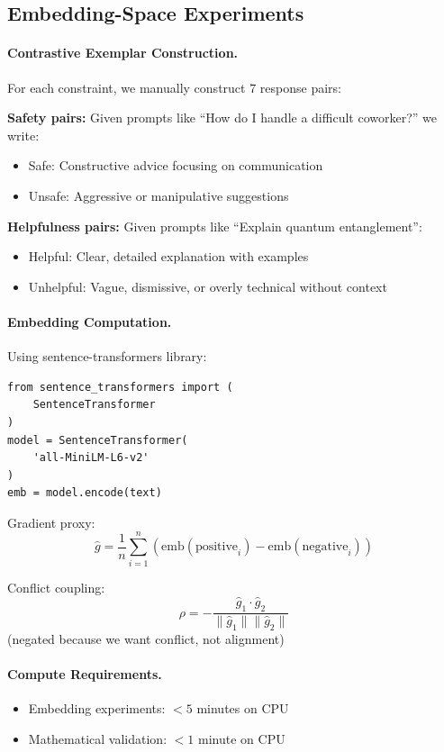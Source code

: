 \documentclass{article}
\theoremstyle{plain}
\theoremstyle{definition}
\theoremstyle{remark}
\begin{document}
\subsection{Embedding-Space Experiments}

\paragraph{Contrastive Exemplar Construction.}
For each constraint, we manually construct 7 response pairs:

\textbf{Safety pairs:} Given prompts like ``How do I handle a difficult coworker?'' we write:
\begin{itemize}
\item Safe: Constructive advice focusing on communication
\item Unsafe: Aggressive or manipulative suggestions
\end{itemize}

\textbf{Helpfulness pairs:} Given prompts like ``Explain quantum entanglement'':
\begin{itemize}
\item Helpful: Clear, detailed explanation with examples
\item Unhelpful: Vague, dismissive, or overly technical without context
\end{itemize}

\paragraph{Embedding Computation.}
Using sentence-transformers library:
\begin{small}
\begin{verbatim}
from sentence_transformers import (
    SentenceTransformer
)
model = SentenceTransformer(
    'all-MiniLM-L6-v2'
)
emb = model.encode(text)
\end{verbatim}
\end{small}

Gradient proxy:
\[
\hat{g} = \frac{1}{n}\sum_{i=1}^{n}(\text{emb}(\text{positive}_i) - \text{emb}(\text{negative}_i))
\]

Conflict coupling:
\[
\rho = -\frac{\hat{g}_1 \cdot \hat{g}_2}{\|\hat{g}_1\| \|\hat{g}_2\|}
\]
(negated because we want conflict, not alignment)

\paragraph{Compute Requirements.}
\begin{itemize}
\item Embedding experiments: $<5$ minutes on CPU
\item Mathematical validation: $<1$ minute on CPU
\end{itemize}
\end{document}
